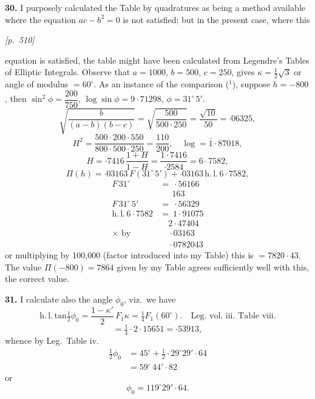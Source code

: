 \documentclass[11pt]{article}
\begin{document}
\textbf{30.} I purposely calculated the Table by quadratures as being a
method available where the equation $ac-b^{2}=0$ is not satisfied; but
in the present case, where this

\medskip

\noindent\textit{[p.~510]}

\medskip

\noindent
equation is satisfied, the table might have been calculated from
Legendre's Tables of Elliptic Integrals. Observe that $a=1000$,
$b=500$, $c=250$, gives $\kappa=\tfrac{1}{2}\sqrt{3}$ or angle of
modulus $=60^{\circ}$. As an instance of the comparison ($^{1}$),
suppose $h=-800$, then $\sin^{2}\phi=\dfrac{200}{750}$,
$\log\sin\phi=9{\cdot}71298$, $\phi=31^{\circ}\,5'$.
\[
\sqrt{\frac{b}{(a-b)(b-c)}}=\sqrt{\frac{500}{500\cdot 250}}=\frac{\sqrt{10}}{50}=\cdot 06325,
\]
\[
H^{2}=\frac{500\cdot 200\cdot 550}{800\cdot 500\cdot 250}=\frac{110}{200},\quad
\log=\bar{1}{\cdot}87018,
\]
\[
H=\cdot 7416\,\frac{1+H}{1-H}=\frac{1{\cdot}7416}{\cdot 2584}=6{\cdot}7582,
\]
\[
\Pi(h)=\cdot 03163\,F(31^{\circ}\,5')+\cdot 03163\,\mathrm{h.\,l.}\,6{\cdot}7582,
\]
\begin{align*}
F\,31^{\circ}\ \  &=\ \cdot 56166 \\
                  &\quad\;\,163 \\
F\,31^{\circ}\,5' &=\ \cdot 56329 \\
\mathrm{h.\,l.}\,6{\cdot}7582 &=\ 1{\cdot}91075 \\
                  &\quad 2{\cdot}47404 \\
\times\text{ by} &\quad\cdot 03163 \\
                  &\quad \cdot 0782043
\end{align*}
or multiplying by 100,000 (factor introduced into my Table) this is
$=7820{\cdot}43$. The value $\Pi(-800)=7864$ given by my Table agrees
sufficiently well with this, the correct value.

\textbf{31.} I calculate also the angle $\phi_{0}$, viz.\ we have
\[
\mathrm{h.\,l.\,tan}\tfrac{1}{2}\phi_{0}=\frac{1-\kappa'}{2}\,F_{1}\kappa
=\tfrac{1}{4}F_{1}(60^{\circ}).\quad\text{Leg.\ vol.\ iii.\ Table viii.}
\]
\[
=\tfrac{1}{4}\cdot 2{\cdot}15651=\cdot 53913,
\]
whence by Leg.\ Table iv.
\begin{align*}
\tfrac{1}{2}\phi_{0} &= 45^{\circ}+\tfrac{1}{2}\cdot 29^{\circ}29'{\cdot}64\\
                     &= 59^{\circ}\,44'{\cdot}82
\end{align*}
or
\[
\phi_{0}=119^{\circ}29'{\cdot}64.
\]
\end{document}
